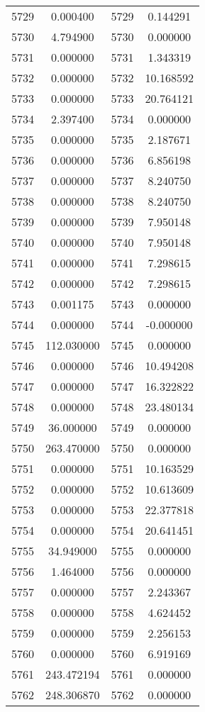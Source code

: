 \documentclass[12pt]{article}
\begin{document}
\begin{longtable}{@{}cccc@{}}
5729 & 0.000400 & 5729 & 0.144291 \\
5730 & 4.794900 & 5730 & 0.000000 \\
5731 & 0.000000 & 5731 & 1.343319 \\
5732 & 0.000000 & 5732 & 10.168592 \\
5733 & 0.000000 & 5733 & 20.764121 \\
5734 & 2.397400 & 5734 & 0.000000 \\
5735 & 0.000000 & 5735 & 2.187671 \\
5736 & 0.000000 & 5736 & 6.856198 \\
5737 & 0.000000 & 5737 & 8.240750 \\
5738 & 0.000000 & 5738 & 8.240750 \\
5739 & 0.000000 & 5739 & 7.950148 \\
5740 & 0.000000 & 5740 & 7.950148 \\
5741 & 0.000000 & 5741 & 7.298615 \\
5742 & 0.000000 & 5742 & 7.298615 \\
5743 & 0.001175 & 5743 & 0.000000 \\
5744 & 0.000000 & 5744 & -0.000000 \\
5745 & 112.030000 & 5745 & 0.000000 \\
5746 & 0.000000 & 5746 & 10.494208 \\
5747 & 0.000000 & 5747 & 16.322822 \\
5748 & 0.000000 & 5748 & 23.480134 \\
5749 & 36.000000 & 5749 & 0.000000 \\
5750 & 263.470000 & 5750 & 0.000000 \\
5751 & 0.000000 & 5751 & 10.163529 \\
5752 & 0.000000 & 5752 & 10.613609 \\
5753 & 0.000000 & 5753 & 22.377818 \\
5754 & 0.000000 & 5754 & 20.641451 \\
5755 & 34.949000 & 5755 & 0.000000 \\
5756 & 1.464000 & 5756 & 0.000000 \\
5757 & 0.000000 & 5757 & 2.243367 \\
5758 & 0.000000 & 5758 & 4.624452 \\
5759 & 0.000000 & 5759 & 2.256153 \\
5760 & 0.000000 & 5760 & 6.919169 \\
5761 & 243.472194 & 5761 & 0.000000 \\
5762 & 248.306870 & 5762 & 0.000000 \\

\end{longtable}
\end{document}
